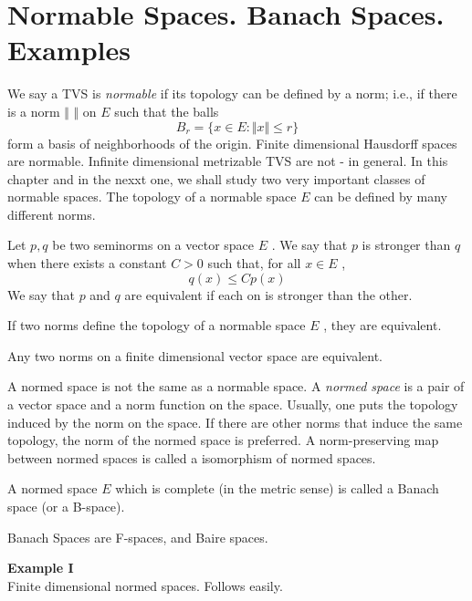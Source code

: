 \section{Normable Spaces. Banach Spaces. Examples}

We say a TVS is \textit{normable} if its topology can be defined by a norm; i.e., if there is a norm $ \Vert \hspace{4pt} \Vert $ on $ E $ such that the balls 
\[
	B_{ r } = \{ x \in E: \Vert x \Vert \leq r \}
\]
form a basis of neighborhoods of the origin. Finite dimensional Hausdorff spaces are normable. Infinite dimensional metrizable TVS are not - in general. In this chapter and in the nexxt one, we shall study two very important classes of normable spaces. The topology of a normable space $ E $ can be defined by many different norms.

\begin{defn}
	Let $ p,q $ be two seminorms on a vector space $ E $ . We say that $ p $ is stronger than $ q $ when there exists a constant $ C > 0 $ such that, for all $ x \in E $ , 
	\[
		q(x) \leq C p(x)
	\]
We say that $ p $ and $ q $ are equivalent if each on is stronger than the other.
	
\end{defn}

\begin{prop}
	If two norms define the topology of a normable space $ E $ , they are equivalent.
\end{prop}

\begin{cor}
	Any two norms on a finite dimensional vector space are equivalent.
\end{cor}

A normed space is not the same as a normable space. A \textit{normed space} is a pair of a vector space and a norm function on the space. Usually, one puts the topology induced by the norm on the space. If there are other norms that induce the same topology, the norm of the normed space is preferred. A norm-preserving map between normed spaces is called a isomorphism of normed spaces.

\begin{defn}
	A normed space $ E $ which is complete (in the metric sense) is called a Banach space (or a B-space).
\end{defn}

Banach Spaces are F-spaces, and Baire spaces.

\textbf{Example I} \\
Finite dimensional normed spaces. Follows easily. \\

